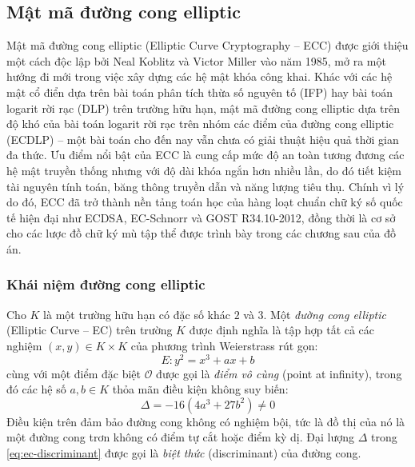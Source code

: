 \subsection{Mật mã đường cong elliptic}

Mật mã đường cong elliptic (Elliptic Curve Cryptography -- ECC) được giới thiệu một cách độc lập bởi Neal Koblitz và Victor Miller vào năm 1985, mở ra một hướng đi mới trong việc xây dựng các hệ mật khóa công khai. Khác với các hệ mật cổ điển dựa trên bài toán phân tích thừa số nguyên tố (IFP) hay bài toán logarit rời rạc (DLP) trên trường hữu hạn, mật mã đường cong elliptic dựa trên độ khó của bài toán logarit rời rạc trên nhóm các điểm của đường cong elliptic (ECDLP) -- một bài toán cho đến nay vẫn chưa có giải thuật hiệu quả thời gian đa thức. Ưu điểm nổi bật của ECC là cung cấp mức độ an toàn tương đương các hệ mật truyền thống nhưng với độ dài khóa ngắn hơn nhiều lần, do đó tiết kiệm tài nguyên tính toán, băng thông truyền dẫn và năng lượng tiêu thụ. Chính vì lý do đó, ECC đã trở thành nền tảng toán học của hàng loạt chuẩn chữ ký số quốc tế hiện đại như ECDSA, EC-Schnorr và GOST R34.10-2012, đồng thời là cơ sở cho các lược đồ chữ ký mù tập thể được trình bày trong các chương sau của đồ án.

\subsubsection{Khái niệm đường cong elliptic}

Cho $K$ là một trường hữu hạn có đặc số khác $2$ và $3$. Một \textit{đường cong elliptic} (Elliptic Curve -- EC) trên trường $K$ được định nghĩa là tập hợp tất cả các nghiệm $(x, y) \in K \times K$ của phương trình Weierstrass rút gọn:
\begin{equation}
E: y^2 = x^3 + ax + b
\label{eq:ec-weierstrass}
\end{equation}
cùng với một điểm đặc biệt $\mathcal{O}$ được gọi là \textit{điểm vô cùng} (point at infinity), trong đó các hệ số $a, b \in K$ thỏa mãn điều kiện không suy biến:
\begin{equation}
\Delta = -16(4a^3 + 27b^2) \neq 0
\label{eq:ec-discriminant}
\end{equation}
Điều kiện trên đảm bảo đường cong không có nghiệm bội, tức là đồ thị của nó là một đường cong trơn không có điểm tự cắt hoặc điểm kỳ dị. Đại lượng $\Delta$ trong \eqref{eq:ec-discriminant} được gọi là \textit{biệt thức} (discriminant) của đường cong.

